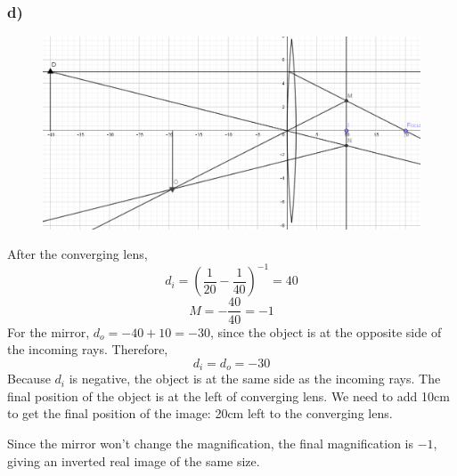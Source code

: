 \documentclass[../homework.tex]{subfiles}
\begin{document}
\subsubsection*{d)}
\begin{figure}[H]
    \centering
    \includegraphics[width=\columnwidth]{p1-d.png}
\end{figure}
After the converging lens,
\begin{equation*}
    d_i = \left(\frac{1}{20} - \frac{1}{40}\right)^{-1} = 40
\end{equation*}
\begin{equation*}
    M = -\frac{40}{40} = -1
\end{equation*}
For the mirror, $d_o = -40 + 10 = -30$, since the object is at the opposite side of the incoming rays. Therefore,
\begin{equation*}
    d_i = d_o = -30
\end{equation*}
Because $d_i$ is negative, the object is at the same side as the incoming rays. The final position of the object is at the left of converging lens. We need to add 10cm to get the final position of the image: 20cm left to the converging lens.

Since the mirror won't change the magnification, the final magnification is $-1$, giving an inverted real image of the same size.
\end{document}
